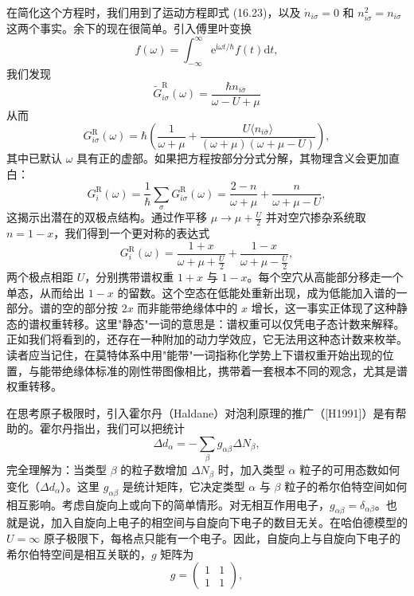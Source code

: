 在简化这个方程时，我们用到了运动方程即式 (16.23)，以及 $\dot{n}_{i\sigma}=0$ 和 $n^{2}_{i\sigma}=n_{i\sigma}$ 这两个事实。余下的现在很简单。引入傅里叶变换
\begin{equation*}
f(\omega)=\int_{-\infty}^{\infty}\mathrm{e}^{\mathrm{i}\omega t/\hbar}f(t)\mathrm{d}t,\tag{16.28}
\end{equation*}
我们发现
\begin{equation*}
\tilde{G}^{\mathrm{R}}_{i\sigma}(\omega)=\frac{\hbar n_{i\bar{\sigma}}}{\omega-U+\mu}\tag{16.29}
\end{equation*}
从而
\begin{equation*}
G^{\mathrm{R}}_{i\sigma}(\omega)=\hbar\left(\frac{1}{\omega+\mu}+\frac{U\langle n_{i\bar{\sigma}}\rangle}{(\omega+\mu)(\omega+\mu-U)}\right),\tag{16.30}
\end{equation*}
其中已默认 $\omega$ 具有正的虚部。如果把方程按部分分式分解，其物理含义会更加直白：
\begin{equation*}
G^{\mathrm{R}}_{i}(\omega)=\frac{1}{\hbar}\sum_{\sigma}G^{\mathrm{R}}_{i\sigma}(\omega)=\frac{2-n}{\omega+\mu}+\frac{n}{\omega+\mu-U},\tag{16.31}
\end{equation*}
这揭示出潜在的双极点结构。通过作平移 $\mu\to\mu+\frac{U}{2}$ 并对空穴掺杂系统取 $n=1-x$，我们得到一个更对称的表达式
\begin{equation*}
G^{\mathrm{R}}_{i}(\omega)=\frac{1+x}{\omega+\mu+\frac{U}{2}}+\frac{1-x}{\omega+\mu-\frac{U}{2}},\tag{16.32}
\end{equation*}
两个极点相距 $U$，分别携带谱权重 $1+x$ 与 $1-x$。每个空穴从高能部分移走一个单态，从而给出 $1-x$ 的留数。这个空态在低能处重新出现，成为低能加入谱的一部分。谱的空的部分按 $2x$ 而非能带绝缘体中的 $x$ 增长，这一事实正体现了这种静态的谱权重转移。这里"静态"一词的意思是：谱权重可以仅凭电子态计数来解释。正如我们将看到的，还存在一种附加的动力学效应，它无法用这种态计数来枚举。读者应当记住，在莫特体系中用"能带"一词指称化学势上下谱权重开始出现的位置，与能带绝缘体标准的刚性带图像相比，携带着一套根本不同的观念，尤其是谱权重转移。

在思考原子极限时，引入霍尔丹（Haldane）对泡利原理的推广（[H1991]）是有帮助的。霍尔丹指出，我们可以把统计
\begin{equation*}
\Delta d_{\alpha}=-\sum_{\beta}g_{\alpha\beta}\Delta N_{\beta},\tag{16.33}
\end{equation*}
完全理解为：当类型 $\beta$ 的粒子数增加 $\Delta N_{\beta}$ 时，加入类型 $\alpha$ 粒子的可用态数如何变化（$\Delta d_{\alpha}$）。这里 $g_{\alpha\beta}$ 是统计矩阵，它决定类型 $\alpha$ 与 $\beta$ 粒子的希尔伯特空间如何相互影响。考虑自旋向上或向下的简单情形。对无相互作用电子，$g_{\alpha\beta}=\delta_{\alpha\beta}$。也就是说，加入自旋向上电子的相空间与自旋向下电子的数目无关。在哈伯德模型的 $U=\infty$ 原子极限下，每格点只能有一个电子。因此，自旋向上与自旋向下电子的希尔伯特空间是相互关联的，$g$ 矩阵为
\begin{equation*}
g=\begin{pmatrix}1 & 1\\ 1 & 1\end{pmatrix},\tag{16.34}
\end{equation*}

